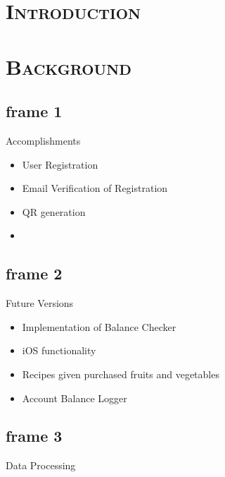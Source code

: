 \documentclass[xcolor=x11names,compress]{beamer}
\renewcommand{\(}{\begin{columns}}
\renewcommand{\)}{\end{columns}}
\newcommand{\<}[1]{\begin{column}{#1}}
\renewcommand{\>}{\end{column}}
\begin{document}
\section{\scshape Introduction}


\section{\scshape Background}
\subsection{frame 1}
\begin{frame}{Accomplishments}
\begin{itemize}
\item User Registration 
\item Email Verification of Registration
\item QR generation
\item 
\end{itemize}
\end{frame}

\subsection{frame 2}
\begin{frame}{Future Versions}
\begin{itemize}
\item Implementation of Balance Checker
\item iOS functionality
\item Recipes given purchased fruits and vegetables
\item Account Balance Logger
\end{itemize}
\end{frame}

\subsection{frame 3}
\begin{frame}{Data Processing}

\end{frame}
\end{document}
